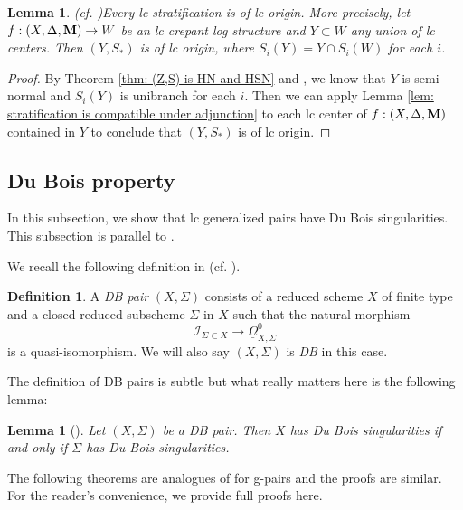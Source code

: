 \documentclass[11pt]{amsart}
\numberwithin{equation}{section}
\newcommand{\Mm}{{\bf{M}}}
\newtheorem{lem}[thm]{Lemma}
\theoremstyle{definition}
\newtheorem{defn}[thm]{Definition}
\theoremstyle{definition}
\theoremstyle{definition}
\begin{document}
\begin{lem}(cf. \cite[5.29]{Kol13})\label{lem: glc stratification is of glc origin}
Every lc stratification is of lc origin. More precisely, let $f:(X,\Delta,\Mm)\to W $ be an lc crepant log structure and $Y\subset W$ any union of lc centers. Then $(Y, S_*)$ is of lc origin, where $S_i(Y)=Y\cap S_i(W)$ for each $i$.
\end{lem}

\begin{proof}
By Theorem \ref{thm: (Z,S) is HN and HSN} and \cite[Theorem 9.26]{Kol13}, we know that $Y$ is semi-normal and $S_i(Y)$ is unibranch for each $i$. Then we can apply Lemma \ref{lem: stratification is compatible under adjunction} to each lc center of $f: (X,\Delta,\Mm)$ contained in $Y$ to conclude that $(Y,S_*)$ is of lc origin.
\end{proof}

\subsection{Du Bois property}\label{subsec: du bois}

In this subsection, we show that lc generalized pairs have Du Bois singularities. This subsection is parallel to \cite[Section 6]{LX23b}. 

We recall the following definition in \cite{Kov11} (cf. \cite[Definition 6.10]{Kol13}). 

\begin{defn}
A \emph{DB pair} $(X,\Sigma)$ consists of a reduced scheme $X$ of finite type and a closed reduced subscheme $\Sigma$ in $X$ such that the natural morphism
$$
\mathcal{I}_{\Sigma\subset X}\to \underline{\Omega}_{X,\Sigma}^0
$$
is a quasi-isomorphism. We will also say $(X,\Sigma)$ is \emph{DB} in this case.
\end{defn}

The definition of DB pairs is subtle but what really matters here is the following lemma:

\begin{lem}[{\cite[Proposition 6.15]{Kol13}}]\label{lem: property of DB pairs}
Let $(X,\Sigma)$ be a DB pair. Then $X$ has Du Bois singularities if and only if $\Sigma$ has Du Bois singularities.
\end{lem}

The following theorems are analogues of \cite[Theorems 6.31, 6.33]{Kol13} for g-pairs and the proofs are similar. For the reader's convenience, we provide full proofs here.
\end{document}
